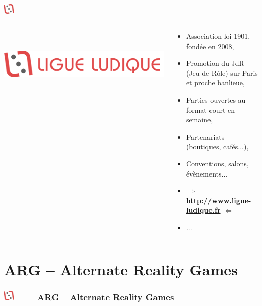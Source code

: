 \documentclass[slidetop,11pt]{beamer}
\def\moreInFrameTitleLeftt{\includegraphics[height=0.5cm]{img/ligueludique-0.png}~~~~~}
\begin{document}
\subsubsection{\sectionPartIaUN}
\begin{frame}
	\frametitle{\moreInFrameTitleLeftt \sectionPartIaUN}
	\begin{columns}[T]
		\begin{column}[T]{3.5cm}
			\includegraphics[height=3.4cm]{img/ligueludique-1.png} %
		\end{column}
		\begin{column}[T]{7cm}
			 \begin{beamerboxesrounded}	[lower=substructureRED, %
							 upper=block title RED,%
							 shadow=true]%
				   {\sectionPartIaUN}
				\begin{itemize}
					\item Association loi 1901, fond{\'e}e en 2008, 
					\item Promotion du JdR (Jeu de R{\^o}le) sur Paris et proche banlieue, 
					\item Parties ouvertes au format court en semaine, 
					\item Partenariats (boutiques, caf{\'e}s...), 
					\item Conventions, salons, {\'e}v{\`e}nements... 
					\item $\Rightarrow$ \underline{\textbf{http://www.ligue-ludique.fr}} $\Leftarrow$
					\item ...
				\end{itemize}
			\end{beamerboxesrounded}
		\end{column}
	\end{columns}
\end{frame}


\def\sectionPartII{ARG -- Alternate Reality Games}
\section{\sectionPartII}
\begin{frame}
	\frametitle{\moreInFrameTitleLeftt \sectionPartII}
	\tableofcontents[sections=2,currentsection,subsectionstyle=show/shaded/hide] %
\end{frame} 
\end{document}

